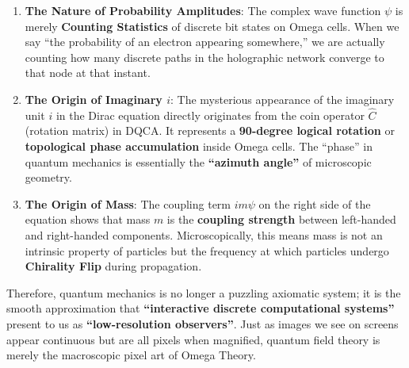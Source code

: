 \begin{enumerate}
\item \textbf{The Nature of Probability Amplitudes}: The complex wave function $\psi$ is merely \textbf{Counting Statistics} of discrete bit states on Omega cells. When we say ``the probability of an electron appearing somewhere,'' we are actually counting how many discrete paths in the holographic network converge to that node at that instant.
\item \textbf{The Origin of Imaginary $i$}: The mysterious appearance of the imaginary unit $i$ in the Dirac equation directly originates from the coin operator $\hat{C}$ (rotation matrix) in DQCA. It represents a \textbf{90-degree logical rotation} or \textbf{topological phase accumulation} inside Omega cells. The ``phase'' in quantum mechanics is essentially the \textbf{``azimuth angle''} of microscopic geometry.
\item \textbf{The Origin of Mass}: The coupling term $im\psi$ on the right side of the equation shows that mass $m$ is the \textbf{coupling strength} between left-handed and right-handed components. Microscopically, this means mass is not an intrinsic property of particles but the frequency at which particles undergo \textbf{Chirality Flip} during propagation.
\end{enumerate}

Therefore, quantum mechanics is no longer a puzzling axiomatic system; it is the smooth approximation that \textbf{``interactive discrete computational systems''} present to us as \textbf{``low-resolution observers''}. Just as images we see on screens appear continuous but are all pixels when magnified, quantum field theory is merely the macroscopic pixel art of Omega Theory.
